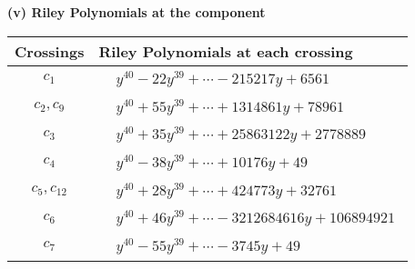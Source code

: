 \documentclass[1p]{elsarticle_modified}
\theoremstyle{definition}
\begin{document}
\newpage\renewcommand{\arraystretch}{1}
\flushleft \textbf{(v) Riley Polynomials at the component}\newline \\
\begin{tabular}{m{50pt}|m{274pt}}
Crossings & \hspace{64pt}Riley Polynomials at each crossing \\
\hline $$\begin{aligned}c_{1}\end{aligned}$$&$\begin{aligned}
&y^{40}-22 y^{39}+\cdots-215217 y+6561
\end{aligned}$\\
\hline $$\begin{aligned}c_{2},c_{9}\end{aligned}$$&$\begin{aligned}
&y^{40}+55 y^{39}+\cdots+1314861 y+78961
\end{aligned}$\\
\hline $$\begin{aligned}c_{3}\end{aligned}$$&$\begin{aligned}
&y^{40}+35 y^{39}+\cdots+25863122 y+2778889
\end{aligned}$\\
\hline $$\begin{aligned}c_{4}\end{aligned}$$&$\begin{aligned}
&y^{40}-38 y^{39}+\cdots+10176 y+49
\end{aligned}$\\
\hline $$\begin{aligned}c_{5},c_{12}\end{aligned}$$&$\begin{aligned}
&y^{40}+28 y^{39}+\cdots+424773 y+32761
\end{aligned}$\\
\hline $$\begin{aligned}c_{6}\end{aligned}$$&$\begin{aligned}
&y^{40}+46 y^{39}+\cdots-3212684616 y+106894921
\end{aligned}$\\
\hline $$\begin{aligned}c_{7}\end{aligned}$$&$\begin{aligned}
&y^{40}-55 y^{39}+\cdots-3745 y+49
\end{aligned}$\\

\end{tabular}
\end{document}
